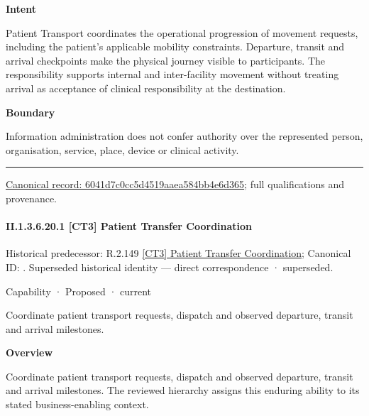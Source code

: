 \textbf{Intent}



Patient Transport coordinates the operational progression of movement requests, including the patient's applicable mobility constraints. Departure, transit and arrival checkpoints make the physical journey visible to participants. The responsibility supports internal and inter-facility movement without treating arrival as acceptance of clinical responsibility at the destination.



\textbf{Boundary}



Information administration does not confer authority over the represented person, organisation, service, place, device or clinical activity.



\medskip\hrule\medskip

{\footnotesize \href{../../../../continuum/strategy/capability/6041d7c0cc5d4519aaea584bb4e6d365.md}{Canonical record: 6041d7c0cc5d4519aaea584bb4e6d365}; full qualifications and provenance.}\par
\paragraph*{II.1.3.6.20.1 [CT3] Patient Transfer Coordination}
\label{navigation:II.1.3.6.20.1}

{\small Historical predecessor: R.2.149 \hyperref[element:b5a76d4877424b2ea9b01fb5fa22772c]{[CT3] Patient Transfer Coordination}; Canonical ID: \texttt{}. Superseded historical identity — direct correspondence · superseded.}\par
\label{element:c7c7aa8e34df4568ae4b91cdde380a11}
{\small Capability · Proposed · current}\par

Coordinate patient transport requests, dispatch and observed departure, transit and arrival milestones.



\textbf{Overview}



Coordinate patient transport requests, dispatch and observed departure, transit and arrival milestones. The reviewed hierarchy assigns this enduring ability to its stated business-enabling context.



